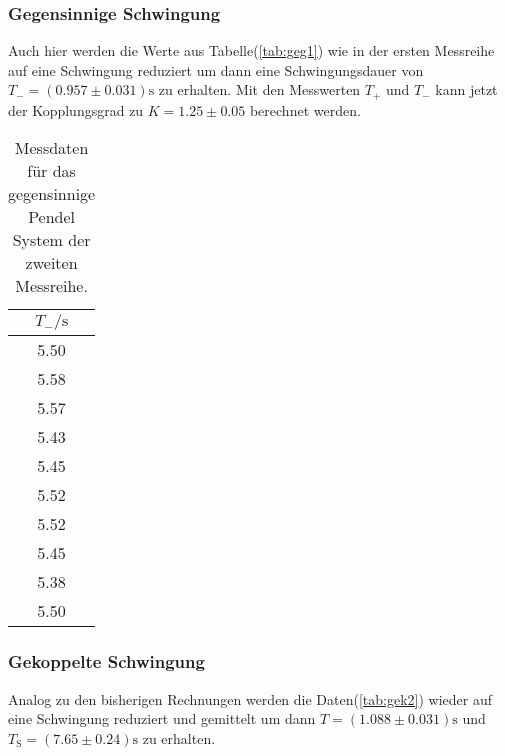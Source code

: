         \subsubsection{Gegensinnige Schwingung}

            \noindent Auch hier werden die Werte aus Tabelle(\ref{tab:geg1}) wie in der ersten Messreihe auf eine Schwingung reduziert 
            um dann eine Schwingungsdauer von $T_- =( 0.957 \pm 0.031) \si{\second}$ zu erhalten. Mit den Messwerten $T_+$ und $T_-$ kann jetzt  
            der Kopplungsgrad zu $K = 1.25 \pm 0.05$ berechnet werden.

            \begin{table}[ht]
                \centering
                \caption{Messdaten für das gegensinnige Pendel System der zweiten Messreihe.}
                \label{tab:geg2}
                \begin{tabular}{c }
                 \toprule
                 $T_- / \si{\s}$ \\
                 \midrule
                 5.50  \\ 
                 5.58  \\ 
                 5.57  \\ 
                 5.43  \\ 
                 5.45  \\ 
                 5.52  \\ 
                 5.52  \\ 
                 5.45  \\ 
                 5.38  \\ 
                 5.50  \\ 
                \end{tabular}
            \end{table}

        \subsubsection{Gekoppelte Schwingung}

            \noindent Analog zu den bisherigen Rechnungen werden die Daten(\ref{tab:gek2}) wieder auf eine Schwingung reduziert und gemittelt um 
            dann $T = (1.088 \pm 0.031) \si{\second}$ und $T_{\text{S}} =(7.65 \pm 0.24) \si{\second}$ zu erhalten.

